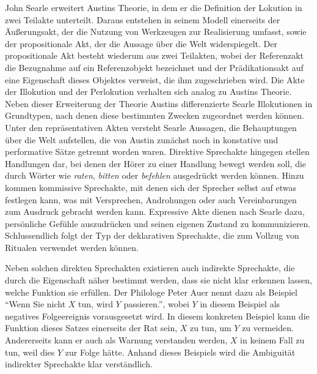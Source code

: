 John Searle erweitert Austins Theorie, in dem er die Definition der Lokution in zwei Teilakte unterteilt.
Daraus entstehen in seinem Modell einerseits der Äußerungsakt, der die Nutzung von Werkzeugen zur Realisierung umfasst, sowie der propositionale Akt, der die Aussage über die Welt widerspiegelt.
Der propositionale Akt besteht wiederum aus zwei Teilakten, wobei der Referenzakt die Bezugnahme auf ein Referenzobjekt bezeichnet und der Prädikationsakt auf eine Eigenschaft dieses Objektes verweist, die ihm zugeschrieben wird.
Die Akte der Illokution und der Perlokution verhalten sich analog zu Austins Theorie.
Neben dieser Erweiterung der Theorie Austins differenzierte Searle Illokutionen in Grundtypen, nach denen diese bestimmten Zwecken zugeordnet werden können.
Unter den repräsentativen Akten versteht Searle Aussagen, die Behauptungen über die Welt aufstellen, die von Austin zunächst noch in konstative und performative Sätze getrennt worden waren.
Direktive Sprechakte hingegen stellen Handlungen dar, bei denen der Hörer zu einer Handlung bewegt werden soll, die durch Wörter wie \emph{raten}, \emph{bitten} oder \emph{befehlen} ausgedrückt werden können.
Hinzu kommen kommissive Sprechakte, mit denen sich der Sprecher selbst auf etwas festlegen kann, was mit Versprechen, Androhungen oder auch Vereinbarungen zum Ausdruck gebracht werden kann.
Expressive Akte dienen nach Searle dazu, persönliche Gefühle auszudrücken und seinen eigenen Zustand zu kommunizieren.
Schlussendlich folgt der Typ der deklarativen Sprechakte, die zum Vollzug von Ritualen verwendet werden können\cite[S. 218]{AL04}.

Neben solchen direkten Sprechakten existieren auch indirekte Sprechakte, die durch die Eigenschaft näher bestimmt werden, dass sie nicht klar erkennen lassen, welche Funktion sie erfüllen\cite[S. 85]{PA99}.
Der Philologe Peter Auer nennt dazu als Beispiel "`Wenn Sie nicht $X$ tun, wird $Y$ passieren."', wobei $Y$ in diesem Beispiel als negatives Folgeereignis vorausgesetzt wird.
In diesem konkreten Beispiel kann die Funktion dieses Satzes einerseits der Rat sein, $X$ zu tun, um $Y$ zu vermeiden.
Andererseits kann er auch als Warnung verstanden werden, $X$ in keinem Fall zu tun, weil dies $Y$ zur Folge hätte.
Anhand dieses Beispiels wird die Ambiguität indirekter Sprechakte klar verständlich.

